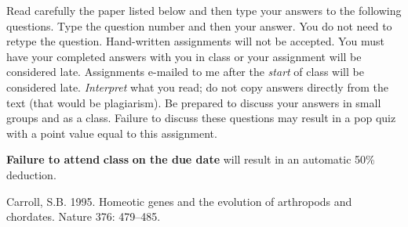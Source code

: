 \documentclass[11pt, addpoints]{exam}
\begin{document}
Read carefully the paper listed below and then type your answers to the following questions.
Type the question number and then your answer. You do not need to retype the question. Hand-written
assignments will not be accepted. You must have your completed answers
with you in class or your assignment will be considered late. Assignments e-mailed to me after the \emph{start} of class will be
considered late. \emph{Interpret} what you read; do not copy answers directly from the text (that would
be plagiarism). Be prepared to discuss your answers in small groups and as a class. Failure
to discuss these questions may result in a pop quiz with a point value
equal to this assignment.

\textbf{Failure to attend} \textbf{class} \textbf{on the due date} will
result in an automatic 50\% deduction.

\begin{hangparas}{1.5em}{1}
Carroll, S.B. 1995. Homeotic genes and the evolution of arthropods and chordates. Nature 376: 479–485.

\end{hangparas}
\end{document}
